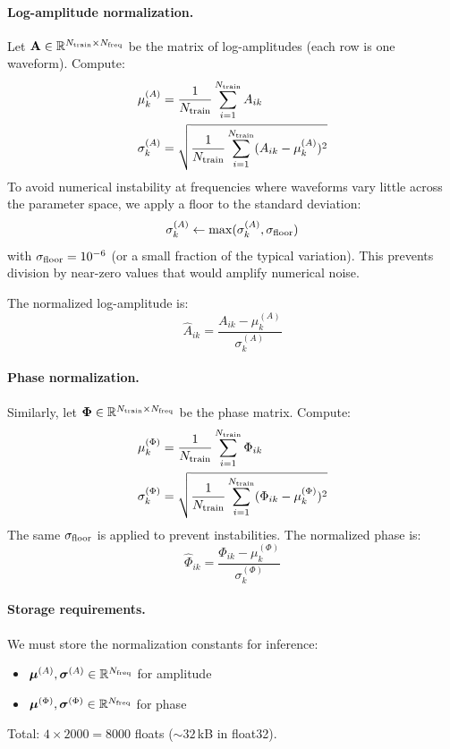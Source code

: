 \documentclass[11pt,a4paper]{article}
\begin{document}
\paragraph{Log-amplitude normalization.}
Let $\mathbf{A} \in \mathbb{R}^{N_{\rm train} \times N_{\rm freq}}$ be the matrix of log-amplitudes (each row is one waveform). Compute:
\begin{align}
    \mu^{(A)}_k &= \frac{1}{N_{\rm train}} \sum_{i=1}^{N_{\rm train}} A_{ik} \\
    \sigma^{(A)}_k &= \sqrt{\frac{1}{N_{\rm train}} \sum_{i=1}^{N_{\rm train}} (A_{ik} - \mu^{(A)}_k)^2}
\end{align}
To avoid numerical instability at frequencies where waveforms vary little across the parameter space, we apply a floor to the standard deviation:
\begin{equation}
    \sigma^{(A)}_k \leftarrow \max(\sigma^{(A)}_k, \sigma_{\rm floor})
\end{equation}
with $\sigma_{\rm floor} = 10^{-6}$ (or a small fraction of the typical variation). This prevents division by near-zero values that would amplify numerical noise.

The normalized log-amplitude is:
\begin{equation}
    \boxed{\hat{A}_{ik} = \frac{A_{ik} - \mu^{(A)}_k}{\sigma^{(A)}_k}}
    \label{eq:amp_norm}
\end{equation}

\paragraph{Phase normalization.}
Similarly, let $\mathbf{\Phi} \in \mathbb{R}^{N_{\rm train} \times N_{\rm freq}}$ be the phase matrix. Compute:
\begin{align}
    \mu^{(\Phi)}_k &= \frac{1}{N_{\rm train}} \sum_{i=1}^{N_{\rm train}} \Phi_{ik} \\
    \sigma^{(\Phi)}_k &= \sqrt{\frac{1}{N_{\rm train}} \sum_{i=1}^{N_{\rm train}} (\Phi_{ik} - \mu^{(\Phi)}_k)^2}
\end{align}
The same $\sigma_{\rm floor}$ is applied to prevent instabilities. The normalized phase is:
\begin{equation}
    \boxed{\hat{\Phi}_{ik} = \frac{\Phi_{ik} - \mu^{(\Phi)}_k}{\sigma^{(\Phi)}_k}}
    \label{eq:phase_norm}
\end{equation}

\paragraph{Storage requirements.}
We must store the normalization constants for inference:
\begin{itemize}
    \item $\bm{\mu}^{(A)}, \bm{\sigma}^{(A)} \in \mathbb{R}^{N_{\rm freq}}$ for amplitude
    \item $\bm{\mu}^{(\Phi)}, \bm{\sigma}^{(\Phi)} \in \mathbb{R}^{N_{\rm freq}}$ for phase
\end{itemize}
Total: $4 \times 2000 = 8000$ floats ($\sim 32\,$kB in float32).
\end{document}
